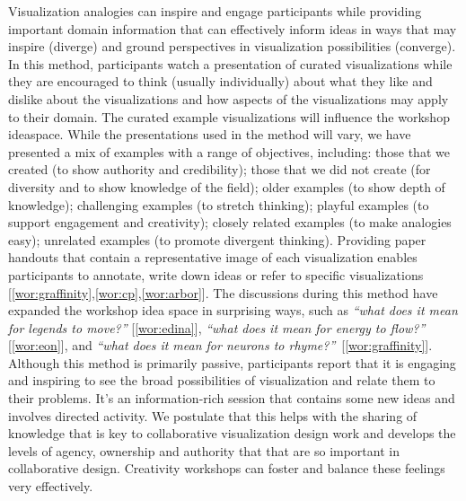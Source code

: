 Visualization analogies can inspire and engage participants while providing important domain information that can effectively inform ideas in ways that may inspire (diverge) and ground perspectives in visualization possibilities (converge). In this method, participants watch a presentation of curated visualizations while they are encouraged to think (usually individually) about what they like and dislike about the visualizations and how aspects of the visualizations may apply to their domain. The curated example visualizations will influence the workshop ideaspace. While the presentations used in the method will vary, we have presented a mix of examples with a range of objectives, including: those that we created (to show authority and credibility); those that we did not create (for diversity and to show knowledge of the field); older examples (to show depth of knowledge); challenging examples (to stretch thinking); playful examples (to support engagement and creativity); closely related examples (to make analogies easy); unrelated examples (to promote divergent thinking). Providing paper handouts that contain a representative image of each visualization enables participants to annotate, write down ideas or refer to specific visualizations [\ref{wor:graffinity},\ref{wor:cp},\ref{wor:arbor}].
The discussions during this method have expanded the workshop idea space in surprising ways, such as \emph{``what does it mean for legends to move?''} [\ref{wor:edina}], \emph{``what does it mean for energy to flow?''} [\ref{wor:eon}], and \emph{``what does it mean for neurons to rhyme?''}~[\ref{wor:graffinity}]. Although this method is primarily passive, participants report that it is engaging and inspiring to see the broad possibilities of visualization and relate them to their problems. It's an information-rich session that contains some new ideas and involves  directed activity. We postulate that this helps with the sharing of knowledge that is key to collaborative visualization design work and develops the levels of agency, ownership and authority that that are so important in collaborative design. Creativity workshops can foster and balance these feelings very effectively.


